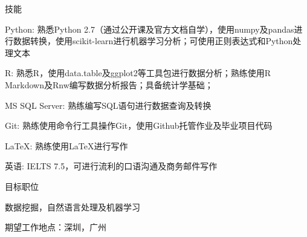 \documentclass{resume} %
\begin{document}

\begin{rSection}{技能}

\begin{rSubsection}{}{}{}{}
\item {Python:} 熟悉Python 2.7（通过公开课及官方文档自学），使用numpy及pandas进行数据转换，使用scikit-learn进行机器学习分析；可使用正则表达式和Python处理文本
\item {R:} 熟悉R，使用data.table及ggplot2等工具包进行数据分析；熟练使用R Markdown及Rnw编写数据分析报告；具备统计学基础；
\item {MS SQL Server:} 熟练编写SQL语句进行数据查询及转换
\item {Git:} 熟练使用命令行工具操作Git，使用Github托管作业及毕业项目代码

\item {\LaTeX:} 熟练使用\LaTeX{}进行写作  
\item{英语:} IELTS 7.5，可进行流利的口语沟通及商务邮件写作
\end{rSubsection}

\end{rSection}


\begin{rSection}{目标职位}
\item 数据挖掘，自然语言处理及机器学习
\item 期望工作地点：深圳，广州
\end{rSection}

\end{document}
